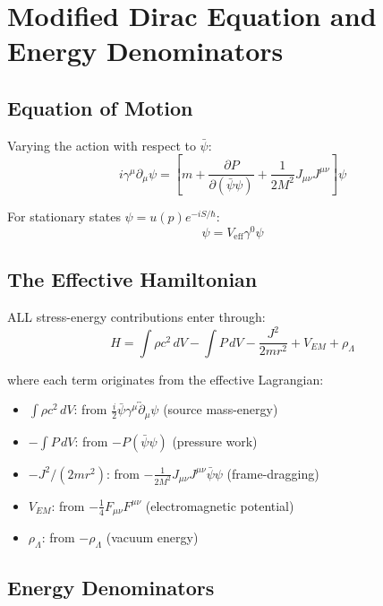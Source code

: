 \documentclass[11pt,a4paper]{article}
\theoremstyle{definition}
\theoremstyle{remark}
\begin{document}
	\section{Modified Dirac Equation and Energy Denominators}
	
	\subsection{Equation of Motion}
	
	Varying the action with respect to $\bar{\psi}$:
	\begin{equation}
		i\gamma^\mu\partial_\mu\psi = \left[m + \frac{\partial P}{\partial(\bar{\psi}\psi)} + \frac{1}{2M^2}J_{\mu\nu}J^{\mu\nu}\right]\psi
	\end{equation}
	
	For stationary states $\psi = u(p)e^{-iS/\hbar}$:
	\begin{equation}
		[\gamma^\mu p_\mu - mc\gamma^0]\psi = V_{\mathrm{eff}}\gamma^0\psi
	\end{equation}
	
	\subsection{The Effective Hamiltonian}
	
	ALL stress-energy contributions enter through:
	\begin{equation}
		\boxed{H = \int\rho c^2\,dV - \int P\,dV - \frac{J^2}{2mr^2} + V_{EM} + \rho_\Lambda}
		\label{eq:hamiltonian}
	\end{equation}
	
	where each term originates from the effective Lagrangian:
	\begin{itemize}
		\item $\int\rho c^2\,dV$: from $\frac{i}{2}\bar{\psi}\gamma^\mu\overleftrightarrow{\partial}_\mu\psi$ (source mass-energy)
		\item $-\int P\,dV$: from $-P(\bar{\psi}\psi)$ (pressure work)
		\item $-J^2/(2mr^2)$: from $-\frac{1}{2M^2}J_{\mu\nu}J^{\mu\nu}\bar{\psi}\psi$ (frame-dragging)
		\item $V_{EM}$: from $-\frac{1}{4}F_{\mu\nu}F^{\mu\nu}$ (electromagnetic potential)
		\item $\rho_\Lambda$: from $-\rho_\Lambda$ (vacuum energy)
	\end{itemize}
	
	\subsection{Energy Denominators}
	
\end{document}
